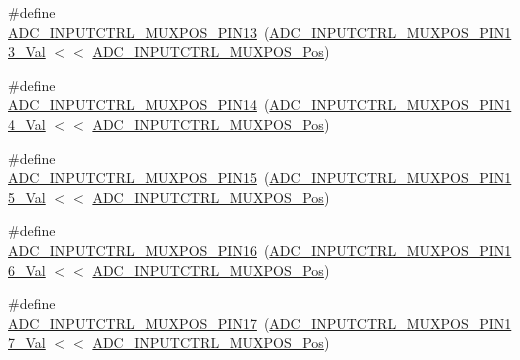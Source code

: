 \begin{DoxyCompactItemize}
\item 
\#define \mbox{\hyperlink{group___s_a_m_d21___a_d_c_ga4d8997259e301d2ad63eea7047090f53}{A\+D\+C\+\_\+\+I\+N\+P\+U\+T\+C\+T\+R\+L\+\_\+\+M\+U\+X\+P\+O\+S\+\_\+\+P\+I\+N13}}~(\mbox{\hyperlink{group___s_a_m_d21___a_d_c_ga7041d34135031f2e4d54b8cdb4d801d7}{A\+D\+C\+\_\+\+I\+N\+P\+U\+T\+C\+T\+R\+L\+\_\+\+M\+U\+X\+P\+O\+S\+\_\+\+P\+I\+N13\+\_\+\+Val}} $<$$<$ \mbox{\hyperlink{group___s_a_m_d21___a_d_c_ga583868be285e1c06c9a93dfd552d8c6a}{A\+D\+C\+\_\+\+I\+N\+P\+U\+T\+C\+T\+R\+L\+\_\+\+M\+U\+X\+P\+O\+S\+\_\+\+Pos}})
\item 
\#define \mbox{\hyperlink{group___s_a_m_d21___a_d_c_gab802c9b725ae155681916ec9fe4e0d8a}{A\+D\+C\+\_\+\+I\+N\+P\+U\+T\+C\+T\+R\+L\+\_\+\+M\+U\+X\+P\+O\+S\+\_\+\+P\+I\+N14}}~(\mbox{\hyperlink{group___s_a_m_d21___a_d_c_gaf82dc124a84397f40adf91d5e361a21a}{A\+D\+C\+\_\+\+I\+N\+P\+U\+T\+C\+T\+R\+L\+\_\+\+M\+U\+X\+P\+O\+S\+\_\+\+P\+I\+N14\+\_\+\+Val}} $<$$<$ \mbox{\hyperlink{group___s_a_m_d21___a_d_c_ga583868be285e1c06c9a93dfd552d8c6a}{A\+D\+C\+\_\+\+I\+N\+P\+U\+T\+C\+T\+R\+L\+\_\+\+M\+U\+X\+P\+O\+S\+\_\+\+Pos}})
\item 
\#define \mbox{\hyperlink{group___s_a_m_d21___a_d_c_gaff3eb66689ac583d75e90783af867de0}{A\+D\+C\+\_\+\+I\+N\+P\+U\+T\+C\+T\+R\+L\+\_\+\+M\+U\+X\+P\+O\+S\+\_\+\+P\+I\+N15}}~(\mbox{\hyperlink{group___s_a_m_d21___a_d_c_gadd16ddb4b686a2d592c36d351b2835b1}{A\+D\+C\+\_\+\+I\+N\+P\+U\+T\+C\+T\+R\+L\+\_\+\+M\+U\+X\+P\+O\+S\+\_\+\+P\+I\+N15\+\_\+\+Val}} $<$$<$ \mbox{\hyperlink{group___s_a_m_d21___a_d_c_ga583868be285e1c06c9a93dfd552d8c6a}{A\+D\+C\+\_\+\+I\+N\+P\+U\+T\+C\+T\+R\+L\+\_\+\+M\+U\+X\+P\+O\+S\+\_\+\+Pos}})
\item 
\#define \mbox{\hyperlink{group___s_a_m_d21___a_d_c_ga4f683fd9a7f1aaf0a099d16bbde45533}{A\+D\+C\+\_\+\+I\+N\+P\+U\+T\+C\+T\+R\+L\+\_\+\+M\+U\+X\+P\+O\+S\+\_\+\+P\+I\+N16}}~(\mbox{\hyperlink{group___s_a_m_d21___a_d_c_gafcbfb20d34f7d6334cf0dde2dd8b818d}{A\+D\+C\+\_\+\+I\+N\+P\+U\+T\+C\+T\+R\+L\+\_\+\+M\+U\+X\+P\+O\+S\+\_\+\+P\+I\+N16\+\_\+\+Val}} $<$$<$ \mbox{\hyperlink{group___s_a_m_d21___a_d_c_ga583868be285e1c06c9a93dfd552d8c6a}{A\+D\+C\+\_\+\+I\+N\+P\+U\+T\+C\+T\+R\+L\+\_\+\+M\+U\+X\+P\+O\+S\+\_\+\+Pos}})
\item 
\#define \mbox{\hyperlink{group___s_a_m_d21___a_d_c_ga65209240678b51e647cb7eefd8c71959}{A\+D\+C\+\_\+\+I\+N\+P\+U\+T\+C\+T\+R\+L\+\_\+\+M\+U\+X\+P\+O\+S\+\_\+\+P\+I\+N17}}~(\mbox{\hyperlink{group___s_a_m_d21___a_d_c_gafa5ffeef4f738cd018787c1e12b2734e}{A\+D\+C\+\_\+\+I\+N\+P\+U\+T\+C\+T\+R\+L\+\_\+\+M\+U\+X\+P\+O\+S\+\_\+\+P\+I\+N17\+\_\+\+Val}} $<$$<$ \mbox{\hyperlink{group___s_a_m_d21___a_d_c_ga583868be285e1c06c9a93dfd552d8c6a}{A\+D\+C\+\_\+\+I\+N\+P\+U\+T\+C\+T\+R\+L\+\_\+\+M\+U\+X\+P\+O\+S\+\_\+\+Pos}})
$$
\end{DoxyCompactItemize}
